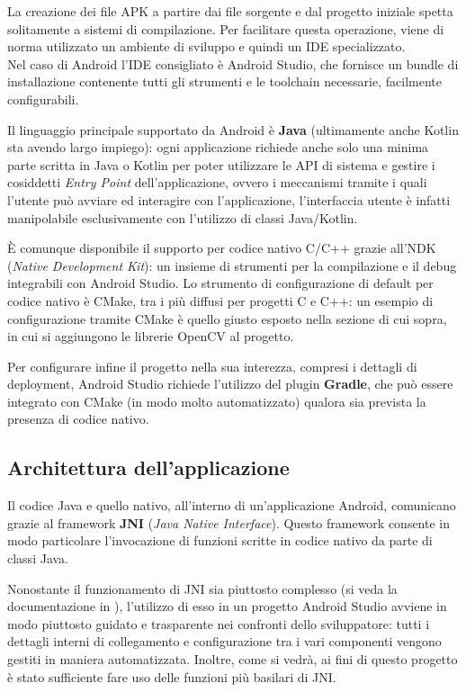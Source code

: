 La creazione dei file APK a partire dai file sorgente e dal progetto iniziale spetta solitamente a sistemi di compilazione.
Per facilitare questa operazione, viene di norma utilizzato un ambiente di sviluppo e quindi un IDE specializzato.\\
Nel caso di Android l'IDE consigliato è Android Studio, che fornisce un bundle di installazione contenente tutti gli strumenti
e le toolchain necessarie, facilmente configurabili.

Il linguaggio principale supportato da Android è \textbf{Java} (ultimamente anche Kotlin sta avendo largo impiego): 
ogni applicazione richiede anche solo una minima parte scritta in Java o Kotlin per poter utilizzare le API di sistema e gestire i 
cosiddetti \emph{Entry Point} dell'applicazione, ovvero i meccanismi tramite i quali l'utente può avviare ed interagire con 
l'applicazione, l'interfaccia utente è infatti manipolabile esclusivamente con l'utilizzo di classi Java/Kotlin.

È comunque disponibile il supporto per codice nativo C/C++ grazie all'NDK (\emph{Native Development Kit}): un insieme di strumenti
per la compilazione e il debug integrabili con Android Studio. Lo strumento di configurazione di default per codice nativo è 
CMake, tra i più diffusi per progetti C e C++: un esempio di configurazione tramite CMake è quello giusto esposto nella
sezione di cui sopra, in cui si aggiungono le librerie OpenCV al progetto.

Per configurare infine il progetto nella sua interezza, compresi i dettagli di deployment, Android Studio richiede l'utilizzo 
del plugin \textbf{Gradle}, che può essere integrato con CMake (in modo molto automatizzato) qualora sia prevista la 
presenza di codice nativo.

\subsection{Architettura dell'applicazione}

Il codice Java e quello nativo, all'interno di un'applicazione Android, comunicano grazie al framework \textbf{JNI} 
(\textit{Java Native Interface}). Questo framework consente in modo particolare l'invocazione di funzioni scritte in codice
nativo da parte di classi Java. 

Nonostante il funzionamento di JNI sia piuttosto complesso (si veda la documentazione in \cite{jnispec}), l'utilizzo di esso 
in un progetto Android Studio avviene in modo piuttosto guidato e trasparente nei confronti dello sviluppatore: tutti i 
dettagli interni di collegamento e configurazione tra i vari componenti vengono gestiti in maniera automatizzata. 
Inoltre, come si vedrà, ai fini di questo progetto è stato sufficiente fare uso delle funzioni più basilari di JNI.

